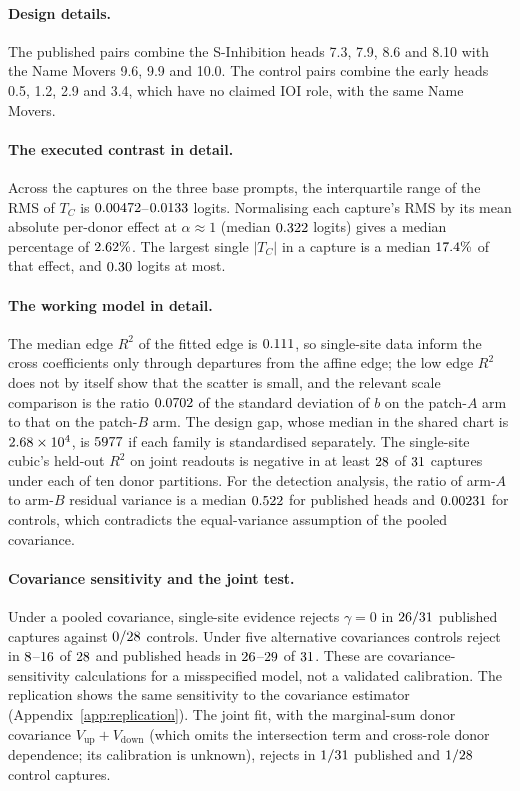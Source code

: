 \paragraph{Design details.} The published pairs combine the S-Inhibition heads 7.3, 7.9, 8.6 and 8.10 with the Name Movers 9.6, 9.9
and 10.0. The control pairs combine the early heads 0.5, 1.2, 2.9 and 3.4, which have no claimed IOI role, with the same Name
Movers.

\paragraph{The executed contrast in detail.} Across the captures on the three base prompts, the interquartile range of
the RMS of $T_C$ is $0.00472$--$0.0133$ logits. Normalising each capture's RMS by its mean absolute per-donor effect at
$\alpha\approx1$ (median $0.322$ logits) gives a median percentage of $2.62\%$.
The largest single $|T_C|$ in a capture is a median $17.4\%$ of that effect, and $0.30$ logits at most.

\paragraph{The working model in detail.} The median edge $R^2$ of the fitted edge is $0.111$, so single-site data
inform the cross coefficients only through departures from the affine edge; the low edge $R^2$ does not by itself show that the scatter is small, and the relevant scale comparison is the ratio $0.0702$ of the standard deviation of $b$ on the patch-$A$ arm to that on the patch-$B$ arm. The design gap, whose median in the shared chart is $2.68\times10^{4}$, is $5977$ if each family is
standardised separately. The single-site cubic's held-out $R^2$ on joint readouts is negative in at least
$28$ of $31$ captures under each of ten donor partitions. For the detection analysis, the ratio of arm-$A$
to arm-$B$ residual variance is a median $0.522$ for published heads and $0.00231$ for controls, which
contradicts the equal-variance assumption of the pooled covariance.

\paragraph{Covariance sensitivity and the joint test.} Under a pooled covariance, single-site evidence rejects $\gamma=0$ in
$26/31$ published captures against $0/28$ controls. Under five alternative covariances controls reject in
$8$--$16$ of $28$ and published heads in $26$--$29$ of $31$. These are
covariance-sensitivity calculations for a misspecified model, not a validated calibration. The replication shows the same
sensitivity to the covariance estimator (Appendix~\ref{app:replication}). The joint fit, with the marginal-sum donor covariance
$V_{\mathrm{up}}+V_{\mathrm{down}}$ (which omits the intersection term and cross-role donor dependence; its calibration is
unknown), rejects in $1/31$ published and $1/28$ control captures.

